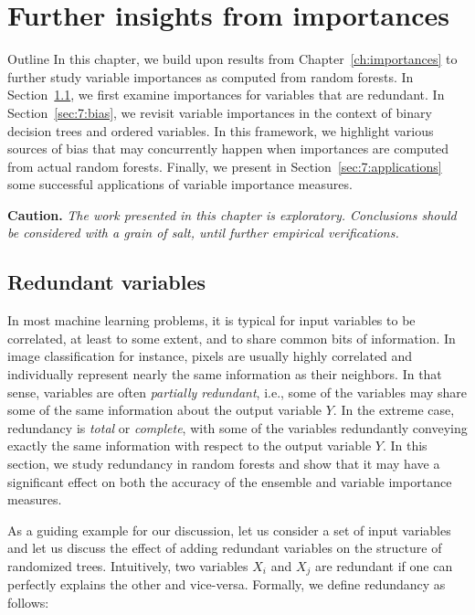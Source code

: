 \chapter{Further insights from importances}\label{ch:applications}

\begin{remark}{Outline}
In this chapter, we build upon results from Chapter~\ref{ch:importances} to
further study variable importances as computed from random forests. In
Section~\ref{sec:7:redundant}, we first examine importances for variables that
are redundant. In Section~\ref{sec:7:bias}, we revisit variable importances in
the context of binary decision trees and ordered variables. In this framework, we
highlight various sources of bias that may concurrently happen when
importances are computed from actual random forests. Finally, we present in
Section~\ref{sec:7:applications} some successful applications
of variable importance measures.
\end{remark}

\noindent\textbf{Caution.} \textit{The work presented in
this chapter is exploratory. Conclusions should be considered with a grain of salt, until
further empirical verifications.}

\section{Redundant variables}
\label{sec:7:redundant}

In most machine learning problems, it is typical for input variables to be
correlated, at least to some extent, and to share common bits of information.
In image classification for instance, pixels are usually highly correlated and
individually represent nearly the same information as their neighbors. In that
sense, variables are often \textit{partially redundant}, i.e., some of the
variables may share some of the same information about the output variable $Y$.
In the extreme case, redundancy is \textit{total}  or \textit{complete}, with
some of the variables redundantly conveying exactly the same information with
respect to the output variable $Y$. In this section, we study redundancy in
random forests and show that it may have a significant effect on both the
accuracy of the ensemble and variable importance measures.

As a guiding example for our discussion, let us consider a set of input
variables and let us discuss the effect of adding redundant variables on the
structure of randomized trees. Intuitively, two variables $X_i$ and $X_j$ are
redundant if one can perfectly explains the other and vice-versa. Formally, we
define redundancy as follows:


